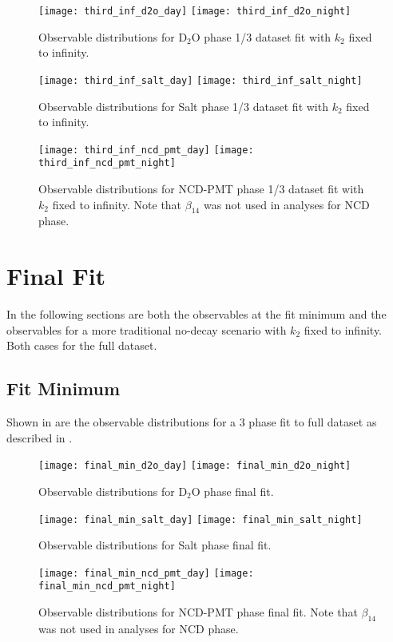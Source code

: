 \begin{figure}
\centering
\texttt{[image: third\_inf\_d2o\_day]}
\texttt{[image: third\_inf\_d2o\_night]}
\caption{\label{fig:third_inf_d2o_obs}Observable distributions for D$_2$O phase 1/3 dataset fit with $k_2$ fixed to infinity.}
\end{figure}
\begin{figure}
\centering
\texttt{[image: third\_inf\_salt\_day]}
\texttt{[image: third\_inf\_salt\_night]}
\caption{\label{fig:third_inf_salt_obs}Observable distributions for Salt phase 1/3 dataset fit with $k_2$ fixed to infinity.}
\end{figure}
\begin{figure}
\centering
\texttt{[image: third\_inf\_ncd\_pmt\_day]}
\texttt{[image: third\_inf\_ncd\_pmt\_night]}
\caption{\label{fig:third_inf_ncd_pmt_obs}Observable distributions for NCD-PMT phase 1/3 dataset fit with $k_2$ fixed to infinity. Note that $\beta_{14}$ was not used in analyses for NCD phase.}
\end{figure}

\clearpage

\section{Final Fit}

\label{final_observables}

In the following sections are both the observables at the fit minimum and the observables for a more traditional no-decay scenario with $k_2$ fixed to infinity. Both cases for the full dataset.

\subsection{Fit Minimum}

Shown in  are the observable distributions for a 3 phase fit to full dataset as described in .

\begin{figure}
\centering
\texttt{[image: final\_min\_d2o\_day]}
\texttt{[image: final\_min\_d2o\_night]}
\caption{\label{fig:final_d2o_obs}Observable distributions for D$_2$O phase final fit.}
\end{figure}
\begin{figure}
\centering
\texttt{[image: final\_min\_salt\_day]}
\texttt{[image: final\_min\_salt\_night]}
\caption{\label{fig:final_salt_obs}Observable distributions for Salt phase final fit.}
\end{figure}
\begin{figure}
\centering
\texttt{[image: final\_min\_ncd\_pmt\_day]}
\texttt{[image: final\_min\_ncd\_pmt\_night]}
\caption{\label{fig:final_ncd_pmt_obs}Observable distributions for NCD-PMT phase final fit. Note that $\beta_{14}$ was not used in analyses for NCD phase.}
\end{figure}

